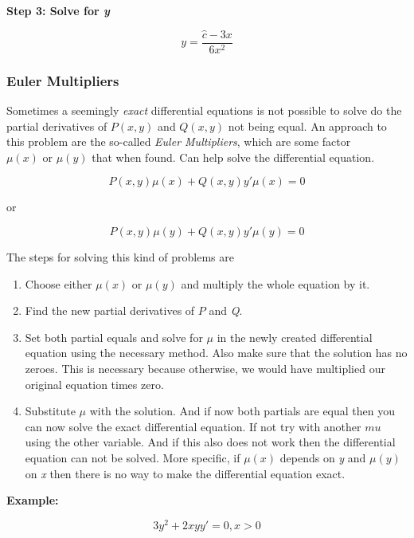 \textbf{Step 3: Solve for \emph{y}}

\[
    y = \frac{\hat{c} - 3x}{6x^2} 
\]

\subsubsection{Euler Multipliers}

Sometimes a seemingly \emph{exact} differential equations is not possible to solve do the partial 
derivatives of \(P(x,y)\) and \(Q(x,y)\) not being equal. An approach to this problem are the so-called 
\emph{Euler Multipliers}, which are some factor \(\mu(x) \text{ or } \mu(y)\) that when found. Can 
help solve the differential equation.

\[
    P(x,y)\mu(x) + Q(x,y)y'\mu(x) = 0
\]

or 

\[
    P(x,y)\mu(y) + Q(x,y)y'\mu(y) = 0
\]

The steps for solving this kind of problems are

\begin{enumerate}
    
    \item Choose either \(\mu(x)\) or \(\mu(y)\) and multiply the whole equation by it.
    
    \item Find the new partial derivatives of \(P\) and \emph{Q}.
    
    \item Set both partial equals and solve for \(\mu\) in the newly created differential equation 
          using the necessary method. Also make sure that the solution has no zeroes. This is necessary 
          because otherwise, we would have multiplied our original equation times zero.
    
    \item Substitute \(\mu\) with the solution. And if now both partials are equal then you can now 
          solve the exact differential equation. If not try with another \(mu\) using the other variable.
          And if this also does not work then the differential equation can not be solved. More specific, 
          if \(\mu(x)\) depends on \emph{y} and \(\mu(y)\) on \emph{x} then there is no way to make the 
          differential equation exact.

\end{enumerate}

\textbf{Example:}

\[
    3y^2 + 2xy y' = 0, x > 0 
\]

